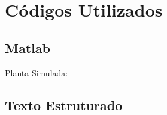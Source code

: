 \appendix
{}%

\chapter{Códigos Utilizados} \label{anexoCodigos}

\section{Matlab}
	Planta Simulada:
	
	
\section{Texto Estruturado}
	

%

